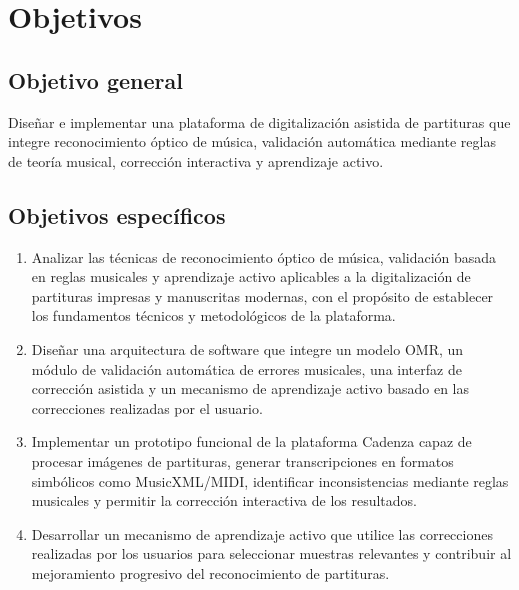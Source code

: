 \documentclass[conference]{IEEEtran}
\begin{document}

\section{Objetivos}

\subsection{Objetivo general}
\label{sec:objetivo-general}

Diseñar e implementar una plataforma de digitalización asistida de partituras que integre reconocimiento óptico de música, validación automática mediante reglas de teoría musical, corrección interactiva y aprendizaje activo.

\subsection{Objetivos específicos}
\label{sec:objetivos-especificos}

\begin{enumerate}
    \item Analizar las técnicas de reconocimiento óptico de música, validación basada en reglas musicales y aprendizaje activo aplicables a la digitalización de partituras impresas y manuscritas modernas, con el propósito de establecer los fundamentos técnicos y metodológicos de la plataforma.

    \item Diseñar una arquitectura de software que integre un modelo OMR, un módulo de validación automática de errores musicales, una interfaz de corrección asistida y un mecanismo de aprendizaje activo basado en las correcciones realizadas por el usuario.

    \item Implementar un prototipo funcional de la plataforma Cadenza capaz de procesar imágenes de partituras, generar transcripciones en formatos simbólicos como MusicXML/MIDI, identificar inconsistencias mediante reglas musicales y permitir la corrección interactiva de los resultados.

    \item Desarrollar un mecanismo de aprendizaje activo que utilice las correcciones realizadas por los usuarios para seleccionar muestras relevantes y contribuir al mejoramiento progresivo del reconocimiento de partituras.

\end{enumerate}
\end{document}
